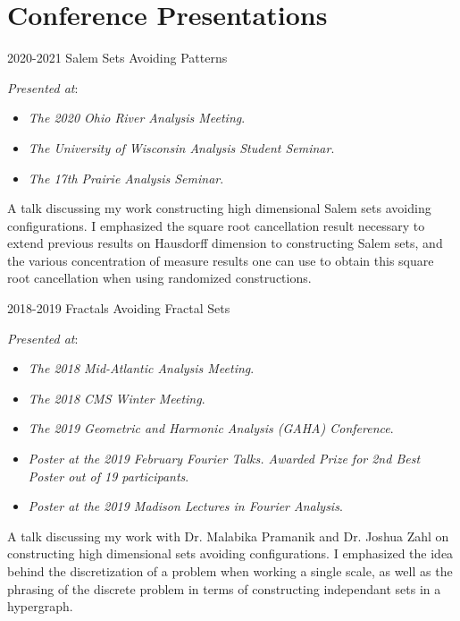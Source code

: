 \documentclass[a4paper]{cv-friggeri}
\begin{document}



\newpage


\section{Conference Presentations}

\begin{entrylist}

\entry
{2020-2021}
{Salem Sets Avoiding Patterns}
{}
{\emph{Presented at}:
%
\begin{itemize}
	\item \emph{The 2020 Ohio River Analysis Meeting}.
	\item \emph{The University of Wisconsin Analysis Student Seminar}.
	\item \emph{The 17th Prairie Analysis Seminar}.
\end{itemize}
%
A talk discussing my work constructing high dimensional Salem sets avoiding configurations. I emphasized the square root cancellation result necessary to extend previous results on Hausdorff dimension to constructing Salem sets, and the various concentration of measure results one can use to obtain this square root cancellation when using randomized constructions.}

\entry
{2018-2019}
{Fractals Avoiding Fractal Sets}
{}
{\emph{Presented at}:
%
\begin{itemize}
	\item \emph{The 2018 Mid-Atlantic Analysis Meeting}.
	\item \emph{The 2018 CMS Winter Meeting}.
	\item \emph{The 2019 Geometric and Harmonic Analysis (GAHA) Conference}.
	\item \emph{Poster at the 2019 February Fourier Talks. Awarded Prize for 2nd Best Poster out of 19 participants}.
	\item \emph{Poster at the 2019 Madison Lectures in Fourier Analysis}.
\end{itemize}
%
A talk discussing my work with Dr. Malabika Pramanik and Dr. Joshua Zahl on constructing high dimensional sets avoiding configurations. I emphasized the idea behind the discretization of a problem when working a single scale, as well as the phrasing of the discrete problem in terms of constructing independant sets in a hypergraph.}

\end{entrylist}
\end{document}
